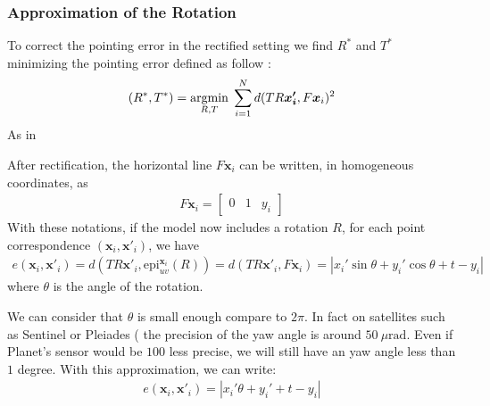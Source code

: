 \documentclass[paper=a4, fontsize=11pt, onecolumn, tikz, dvipsnames, svgnames, x11names]{article}
\begin{document}
\subsubsection{Approximation of the Rotation}

To correct the pointing error in the rectified setting we find $R^*$ and $T^*$ minimizing the pointing error defined as follow :
\begin{align}
    (R^*, T^*) = \underset{R,T}{\operatorname{argmin}}\; \sum_{i=1}^N d(TR\bm{x_i'}, F\bm{x}_i)^2
\end{align}
As in~\cite{de2014b}

After rectification, the horizontal line $F\bm{x}_i$ can be written, in homogeneous coordinates, as
\begin{align*}
F\bm{x}_i =  \begin{bmatrix} 0 & 1 & y_i \end{bmatrix}
\end{align*}
With these notations, if the model now includes a rotation $R$, for each point correspondence $(\bm{x}_i , \bm{x}'_i)$, we have
\begin{align*}
e(\textbf{x}_i, \textbf{x}'_i) = d(TR\bm{x}'_i, \text{epi}^{\bm{x}_i}_{u v}(R)) = d(TR\bm{x}'_i, F\bm{x}_i) = |x_i' \sin \theta   + y_i' \cos \theta  + t - y_i |
\end{align*}
where $\theta$ is the angle of the rotation.

We can consider that $\theta$ is small enough compare to $2\pi$. In fact on satellites such as Sentinel or Pleiades (%
the precision of the yaw angle is around $50~\mu \text{rad}$. Even if Planet's sensor would be $100$ less precise, we will still have an yaw angle less than $1$ degree.
With this approximation, we can write:
\begin{align*}
e(\textbf{x}_i, \textbf{x}'_i) = |x_i' \theta   + y_i' + t - y_i |
\end{align*}
\end{document}
